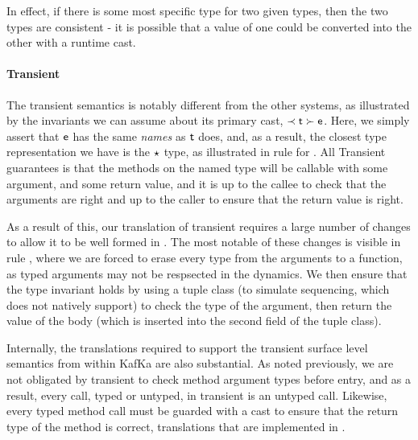 \documentclass[a4paper,USenglish]{tex/lipics-v2016}
\begin{document}
In effect, if there is some most specific type for two given types, then the two types are consistent - it is possible that a value of one could be converted into the other with a runtime cast.

\paragraph{Transient}

The transient semantics is notably different from the other systems, as illustrated by the invariants we can assume about its primary cast, $\ShaCast\t\e$. Here, we simply assert that $\e$ has the same \emph{names} as $\t$ does, and, as a result, the closest type representation we have is the $\any$ type, as illustrated in rule  for \kafka. All Transient guarantees is that the methods on the named type will be callable with some argument, and some return value, and it is up to the callee to check that the arguments are right and up to the caller to ensure that the return value is right.

As a result of this, our translation of transient requires a large number of changes to allow it to be well formed in \kafka. The most notable of these changes is visible in rule , where we are forced to erase every type from the arguments to a function, as typed arguments may not be respsected in the dynamics. We then ensure that the type invariant holds by using a tuple class (to simulate sequencing, which \kafka does not natively support) to check the type of the argument, then return the value of the body (which is inserted into the second field of the tuple class).


\begin{mathpar}

\end{mathpar}

Internally, the translations required to support the transient surface level semantics from within KafKa are also substantial. As noted previously, we are not obligated by transient to check method argument types before entry, and as a result, every call, typed or untyped, in transient is an untyped call. Likewise, every typed method call must be guarded with a cast to ensure that the return type of the method is correct, translations that are implemented in .
 
\end{document}
